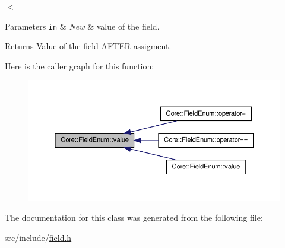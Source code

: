 $<$ 
\begin{DoxyParams}[1]{Parameters}
\mbox{\tt in}  & {\em New} & value of the field. \\
\hline
\end{DoxyParams}
\begin{DoxyReturn}{Returns}
Value of the field AFTER assigment. 
\end{DoxyReturn}
 

Here is the caller graph for this function:
\nopagebreak
\begin{figure}[H]
\begin{center}
\leavevmode
\includegraphics[width=380pt]{d3/db7/classCore_1_1FieldEnum_af10b8aa54cc84acda18cbf85614e26f2_icgraph}
\end{center}
\end{figure}




The documentation for this class was generated from the following file:\begin{DoxyCompactItemize}
\item 
src/include/\hyperlink{field_8h}{field.h}\end{DoxyCompactItemize}
